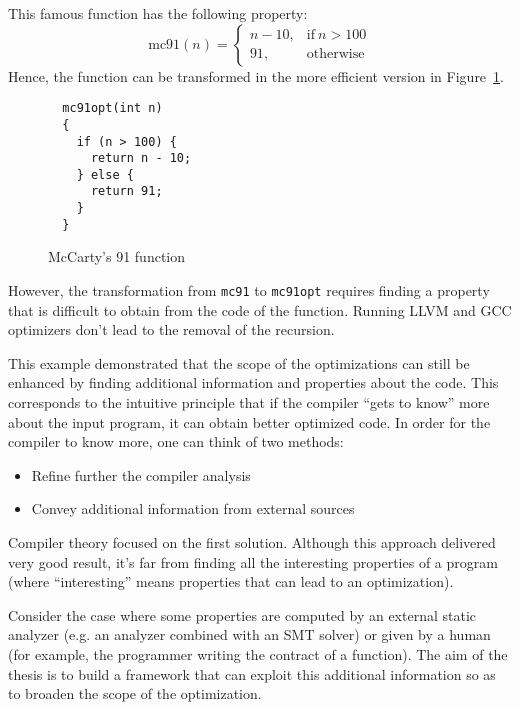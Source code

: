 This famous function has the following property:
\[\text{mc91}(n) =
\begin{cases}
n-10, & \text{if}\:n>100\\
91, & \text{otherwise}
\end{cases}\]
Hence, the function can be transformed in the more efficient version in Figure~\ref{fig:mccartyopt}.

\begin{figure}[t]
  \begin{mdframed}
  \centering
  \begin{lstlisting}
  mc91opt(int n)
  {
    if (n > 100) {
      return n - 10;
    } else {
      return 91;
    }
  }
  \end{lstlisting}
  \end{mdframed}
  \caption{McCarty's 91 function}
  \label{fig:mccartyopt}
\end{figure}

However, the transformation from \texttt{mc91} to \texttt{mc91opt} requires finding a property that is difficult to obtain from the code of the function. Running LLVM and GCC optimizers don't lead to the removal of the recursion.

This example demonstrated that the scope of the optimizations can still be enhanced by finding additional information and properties about the code. This corresponds to the intuitive principle that if the compiler ``gets to know'' more about the input program, it can obtain better optimized code. In order for the compiler to know more, one can think of two methods:
\begin{itemize}
  \item Refine further the compiler analysis
  \item Convey additional information from external sources
\end{itemize}

Compiler theory focused on the first solution. Although this approach delivered very good result, it's far from finding all the interesting properties of a program (where ``interesting'' means properties that can lead to an optimization).

Consider the case where some properties are computed by an external static analyzer (e.g. an analyzer combined with an SMT solver) or given by a human (for example, the programmer writing the contract of a function).
The aim of the thesis is to build a framework that can exploit this additional information so as to broaden the scope of the optimization.

